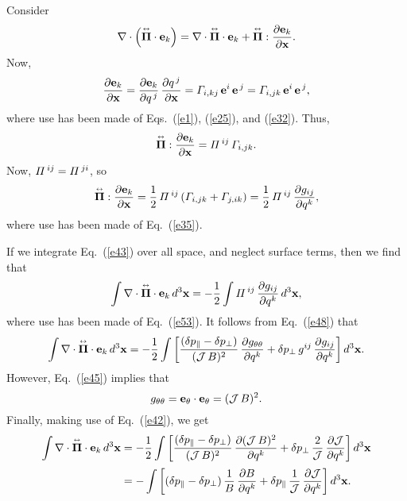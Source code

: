 \documentclass[12pt,prb,aps,notitlepage]{revtex4-1}
\newcommand{\bPi}{\mbox{\boldmath$\Pi$}}
\newcommand{\smalltensor}[1]{\overset{\text{\tiny$\leftrightarrow$}}{#1}}
\begin{document}
 Consider
 \begin{equation}\label{e43}
 \nabla\cdot\left(\smalltensor{\bPi}\cdot {\bf e}_k\right)= \nabla\cdot\smalltensor{\bPi}\cdot{\bf e}_k+ \smalltensor{\bPi}:\frac{\partial {\bf e}_k}{\partial{\bf x}}.
 \end{equation}
 Now,
  \begin{equation}
 \frac{\partial {\bf e}_k}{\partial{\bf x}}= \frac{\partial{\bf e}_k}{\partial q^{\,j}}\,\frac{\partial q^{\,j}}{\partial {\bf x}}= {\mit\Gamma}_{i,kj}\,{\bf e}^i\,{\bf e}^{\,j}
 = {\mit\Gamma}_{i,jk}\,{\bf e}^i\,{\bf e}^{\,j},
 \end{equation}
 where use has been made of Eqs.~(\ref{e1}), (\ref{e25}), and (\ref{e32}). 
 Thus,
 \begin{equation}
 \smalltensor{\bPi}:\frac{\partial {\bf e}_k}{\partial{\bf x}}= {\mit\Pi}^{\,ij}\,{\mit\Gamma}_{i,jk}.
 \end{equation}
 Now,  ${\mit\Pi}^{\,ij}={\mit\Pi}^{\,ji}$, so  
 \begin{equation}\label{e53}
 \smalltensor{\bPi}:\frac{\partial {\bf e}_k}{\partial{\bf x}}= \frac{1}{2}\,{\mit\Pi}^{\,ij}\left({\mit\Gamma}_{i,jk}+{\mit\Gamma}_{j,ik}\right)= \frac{1}{2}\,{\mit\Pi}^{\,ij}\,\frac{\partial g_{ij}}{\partial q^k},
 \end{equation}
 where use has been made of Eq.~(\ref{e35}).
 
 If we integrate Eq.~(\ref{e43}) over all space, and neglect surface terms, then we find that
 \begin{equation}
 \int \nabla\cdot\smalltensor{\bPi}\cdot{\bf e}_k\,d^3{\bf x}= - \frac{1}{2}\int {\mit\Pi}^{\,ij}\,\frac{\partial g_{ij}}{\partial q^k}\,d^3{\bf x},
 \end{equation}
 where use has been made of Eq.~(\ref{e53}). It follows from Eq.~(\ref{e48}) that
 \begin{equation}
 \int \nabla\cdot\smalltensor{\bPi}\cdot{\bf e}_k\,d^3{\bf x}= - \frac{1}{2}\int \left[\frac{(\delta p_\parallel-\delta p_\perp)}{({\cal J}\,B)^2}\,\frac{\partial g_{\theta\theta}}{\partial q^k}+\delta p_\perp\,g^{ij}\,\frac{\partial g_{ij}}{\partial q^k}\right]d^3{\bf x}.
 \end{equation}
 However, Eq.~(\ref{e45}) implies that
 \begin{equation}\label{gtt}
 g_{\theta\theta}= {\bf e}_\theta\cdot{\bf e}_\theta = ({\cal J}\,B)^2.
 \end{equation}
 Finally, making use of Eq.~(\ref{e42}), we get
 \begin{align}\label{e57}
 \int \nabla\cdot\smalltensor{\bPi}\cdot{\bf e}_k\,d^3{\bf x}&= - \frac{1}{2}\int \left[\frac{(\delta p_\parallel-\delta p_\perp)}{({\cal J}\,B)^2}\,\frac{\partial ({\cal J}\,B)^2}{\partial q^k}+\delta p_\perp\,\frac{2}{{\cal J}}\,\frac{\partial{\cal J}}{\partial q^k}\right]d^3{\bf x}\nonumber\\[0.5ex]
 &= -\int \left[(\delta p_\parallel-\delta p_\perp)\,\frac{1}{B}\,\frac{\partial B}{\partial q^k}+\delta p_\parallel\,\frac{1}{{\cal J}}\,\frac{\partial{\cal J}}{\partial q^k}\right]d^3{\bf x}.
 \end{align}
 
\end{document}
